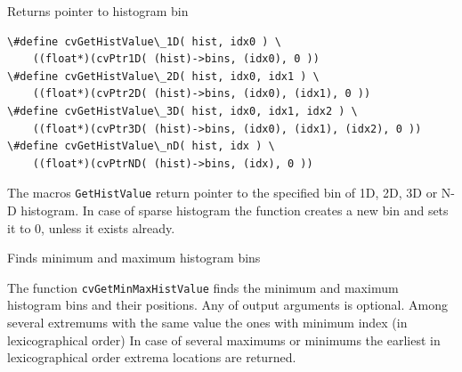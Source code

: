 \label{GetHistValue_nD}

Returns pointer to histogram bin

\begin{lstlisting}
\#define cvGetHistValue\_1D( hist, idx0 ) \
    ((float*)(cvPtr1D( (hist)->bins, (idx0), 0 ))
\#define cvGetHistValue\_2D( hist, idx0, idx1 ) \
    ((float*)(cvPtr2D( (hist)->bins, (idx0), (idx1), 0 ))
\#define cvGetHistValue\_3D( hist, idx0, idx1, idx2 ) \
    ((float*)(cvPtr3D( (hist)->bins, (idx0), (idx1), (idx2), 0 ))
\#define cvGetHistValue\_nD( hist, idx ) \
    ((float*)(cvPtrND( (hist)->bins, (idx), 0 ))
\end{lstlisting}

\begin{description}
\cvarg{hist}{Histogram}
\end{description}

The macros \texttt{GetHistValue} return pointer to the specified bin of 1D, 2D, 3D or N-D histogram. In case of sparse histogram the function creates a new bin and sets it to 0, unless it exists already.


\label{GetMinMaxHistValue}

Finds minimum and maximum histogram bins


\begin{description}
\end{description}

The function \texttt{cvGetMinMaxHistValue} finds the minimum and
maximum histogram bins and their positions. Any of output arguments is
optional. Among several extremums with the same value the ones with
minimum index (in lexicographical order) In case of several maximums
or minimums the earliest in lexicographical order extrema locations
are returned.

